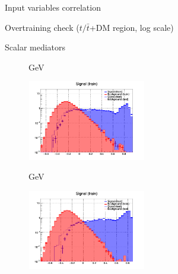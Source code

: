 \documentclass[8pt]{beamer}
\begin{document}
\begin{frame}{Input variables correlation}
\begin{figure}[htbp]
\label{fig:correlationVar}
\end{figure}
\end{frame}

\begin{frame}{Overtraining check ($t/\bar t$+DM region, log scale)}
\justifying
\begin{block}{\centering Scalar mediators}\end{block} \vspace{-10pt}
\begin{figure}[htbp]
\centering
\begin{minipage}[b]{.49\textwidth}
\vspace{-5pt}
\begin{block}{ GeV}\end{block}
\begin{center}
\includegraphics[width=5.2cm, height=3.5cm]{figs/log_scalar_overtraining_100GeV_ST.png}
\end{center}
\end{minipage}
\begin{minipage}[b]{.02\textwidth}\end{minipage}
\begin{minipage}[b]{.49\textwidth}
\vspace{-5pt}
\begin{block}{ GeV}\end{block}
\begin{center}
\includegraphics[width=5.2cm, height=3.5cm]{figs/log_scalar_overtraining_500GeV_ST.png}
\end{center}
\end{minipage}
\end{figure} \vfill


\end{frame}
\end{document}
